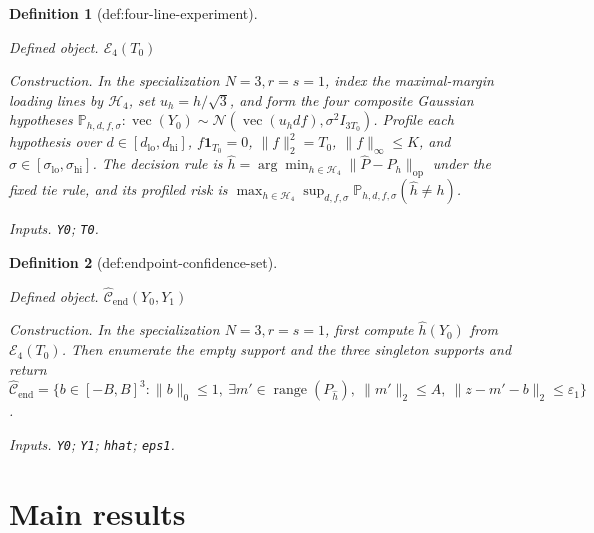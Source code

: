 \documentclass{article}
\newtheorem{definition}{Definition}
\begin{document}
\begin{definition}[def:four-line-experiment]\label{def:four-line-experiment}
\par\smallskip\noindent\emph{Defined object.} \(\mathcal E_4(T_0)\)
\par\smallskip\noindent\emph{Construction.} In the specialization \(N=3,r=s=1\), index the maximal-margin loading lines by \(\mathcal H_4\), set \(u_h=h/\sqrt3\), and form the four composite Gaussian hypotheses \(\mathbb P_{h,d,f,\sigma}:\operatorname{vec}(Y_0)\sim\mathcal N(\operatorname{vec}(u_hdf),\sigma^2I_{3T_0})\). Profile each hypothesis over \(d\in[d_{\mathrm{lo}},d_{\mathrm{hi}}]\), \(f\mathbf1_{T_0}=0\), \(\lVert f\rVert_2^2=T_0\), \(\lVert f\rVert_\infty\le K\), and \(\sigma\in[\sigma_{\mathrm{lo}},\sigma_{\mathrm{hi}}]\). The decision rule is \(\widehat h=\arg\min_{h\in\mathcal H_4}\lVert\widehat P-P_h\rVert_{\mathrm{op}}\) under the fixed tie rule, and its profiled risk is \(\max_{h\in\mathcal H_4}\sup_{d,f,\sigma}\mathbb P_{h,d,f,\sigma}(\widehat h\ne h)\).
\par\smallskip\noindent\emph{Inputs.} \texttt{Y0}; \texttt{T0}.
\end{definition}

\begin{definition}[def:endpoint-confidence-set]\label{def:endpoint-confidence-set}
\par\smallskip\noindent\emph{Defined object.} \(\widehat{\mathcal C}_{\mathrm{end}}(Y_0,Y_1)\)
\par\smallskip\noindent\emph{Construction.} In the specialization \(N=3,r=s=1\), first compute \(\widehat h(Y_0)\) from \(\mathcal E_4(T_0)\). Then enumerate the empty support and the three singleton supports and return \(\widehat{\mathcal C}_{\mathrm{end}}=\{b\in[-B,B]^3:\lVert b\rVert_0\le1,\ \exists m'\in\operatorname{range}(P_{\widehat h}),\ \lVert m'\rVert_2\le A,\ \lVert z-m'-b\rVert_2\le\varepsilon_1\}\).
\par\smallskip\noindent\emph{Inputs.} \texttt{Y0}; \texttt{Y1}; \texttt{hhat}; \texttt{eps1}.
\end{definition}

\section{Main results}
\end{document}

